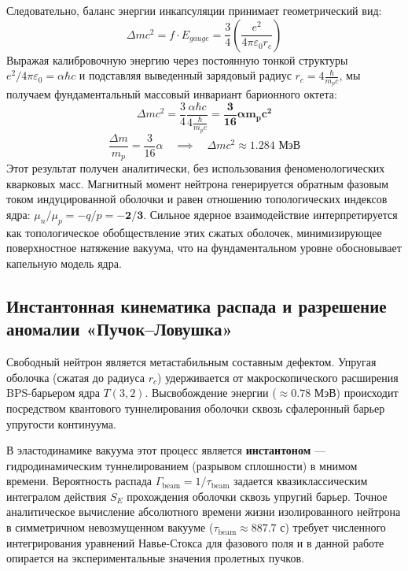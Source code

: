 \documentclass[12pt,a4paper]{article}
\begin{document}
	Следовательно, баланс энергии инкапсуляции принимает геометрический вид:
	\begin{equation}
		\Delta m c^2 = f \cdot E_{gauge} = \frac{3}{4} \left( \frac{e^2}{4\pi\varepsilon_0 r_c} \right)
	\end{equation}
	Выражая калибровочную энергию через постоянную тонкой структуры $e^2 / 4\pi\varepsilon_0 = \alpha \hbar c$ и подставляя выведенный зарядовый радиус $r_c = 4 \frac{\hbar}{m_p c}$, мы получаем фундаментальный массовый инвариант барионного октета:
	\begin{equation}
		\Delta m c^2 = \frac{3}{4} \frac{\alpha \hbar c}{4 \frac{\hbar}{m_p c}} = \mathbf{\frac{3}{16} \alpha m_p c^2}
	\end{equation}
	\begin{equation}
		\frac{\Delta m}{m_p} = \frac{3}{16} \alpha \quad \implies \quad \Delta m c^2 \approx \mathbf{1.284 \text{ МэВ}}
	\end{equation}
	Этот результат получен аналитически, без использования феноменологических кварковых масс. 
	Магнитный момент нейтрона генерируется обратным фазовым током индуцированной оболочки и равен отношению топологических индексов ядра: $\mu_n / \mu_p = -q/p = \mathbf{-2/3}$. 
	Сильное ядерное взаимодействие интерпретируется как топологическое обобществление этих сжатых оболочек, минимизирующее поверхностное натяжение вакуума, что на фундаментальном уровне обосновывает капельную модель ядра.

	\subsection{Инстантонная кинематика распада и разрешение аномалии «Пучок–Ловушка»}
	
	Свободный нейтрон является метастабильным составным дефектом. Упругая оболочка (сжатая до радиуса $r_c$) удерживается от макроскопического расширения BPS-барьером ядра $T(3,2)$. Высвобождение энергии ($\approx 0.78$ МэВ) происходит посредством квантового туннелирования оболочки сквозь сфалеронный барьер упругости континуума.
	
	В эластодинамике вакуума этот процесс является \textbf{инстантоном} — гидродинамическим туннелированием (разрывом сплошности) в мнимом времени. Вероятность распада $\Gamma_{\text{beam}} = 1/\tau_{\text{beam}}$ задается квазиклассическим интегралом действия $S_E$ прохождения оболочки сквозь упругий барьер. Точное аналитическое вычисление абсолютного времени жизни изолированного нейтрона в симметричном невозмущенном вакууме ($\tau_{\text{beam}} \approx 887.7$ с) требует численного интегрирования уравнений Навье-Стокса для фазового поля и в данной работе опирается на экспериментальные значения пролетных пучков.
	
\end{document}

